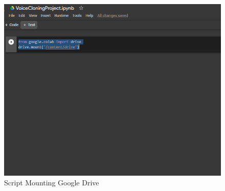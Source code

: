 \begin{enumerate}
\begin{figure}[H]
    \centering
    \includegraphics[scale=0.5]{figures/colab3}
    \caption{Script Mounting Google Drive}
    \label{colab3}
\end{figure}


\end{enumerate}
